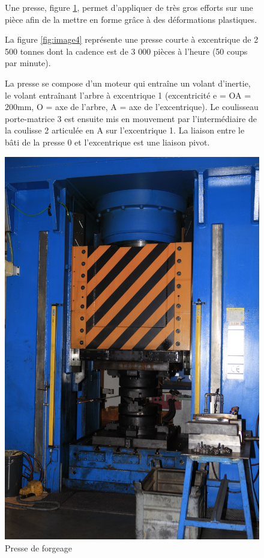 \begin{figure}[!h]
\begin{minipage}[c]{.6\linewidth}
Une presse, figure \ref{fig:image3}, permet d'appliquer de très gros efforts sur une pièce afin de la mettre en forme grâce à des déformations plastiques.

La figure \ref{fig:image4} représente une presse courte à excentrique de 2 500 tonnes dont la cadence est de 3 000 pièces à l'heure (50 coups par minute).

La presse se compose d'un moteur qui entraîne un volant d'inertie, le volant entraînant l'arbre à excentrique 1 (excentricité e = OA = 200mm, O = axe de l'arbre, A = axe de l'excentrique).
Le coulisseau porte-matrice 3 est ensuite mis en mouvement par l'intermédiaire de la coulisse 2 articulée en A sur l'excentrique 1. La liaison entre le bâti de la presse 0 et l'excentrique est une liaison pivot.
\end{minipage}
\hfill
\begin{minipage}[c]{.35\linewidth}
\begin{center}
\includegraphics[width=\linewidth]{img/presse.jpg}
\caption{Presse de forgeage}
\label{fig:image3}
\end{center}
\end{minipage}
\end{figure}

